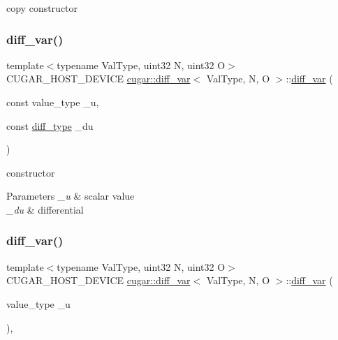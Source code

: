 copy constructor \mbox{\label{structcugar_1_1diff__var_a3fa7d4d596c209e89ae543fe023666ca}} 
\subsubsection{\texorpdfstring{diff\+\_\+var()}{diff\_var()}\hspace{0.1cm}{\footnotesize\ttfamily [3/4]}}
{\footnotesize\ttfamily template$<$typename Val\+Type, uint32 N, uint32 O$>$ \\
C\+U\+G\+A\+R\+\_\+\+H\+O\+S\+T\+\_\+\+D\+E\+V\+I\+CE \hyperlink{structcugar_1_1diff__var}{cugar\+::diff\+\_\+var}$<$ Val\+Type, N, O $>$\+::\hyperlink{structcugar_1_1diff__var}{diff\+\_\+var} (\begin{DoxyParamCaption}\item[{const value\+\_\+type}]{\+\_\+u,  }\item[{const \hyperlink{structcugar_1_1_vector}{diff\+\_\+type}}]{\+\_\+du }\end{DoxyParamCaption})\hspace{0.3cm}{\ttfamily [inline]}}

constructor


\begin{DoxyParams}{Parameters}
{\em \+\_\+u} & scalar value \\
\hline
{\em \+\_\+du} & differential \\
\hline
\end{DoxyParams}
\mbox{\label{structcugar_1_1diff__var_a3dfedcb37cf1bdbf2f6b2f9bd15bc65f}} 
\subsubsection{\texorpdfstring{diff\+\_\+var()}{diff\_var()}\hspace{0.1cm}{\footnotesize\ttfamily [4/4]}}
{\footnotesize\ttfamily template$<$typename Val\+Type, uint32 N, uint32 O$>$ \\
C\+U\+G\+A\+R\+\_\+\+H\+O\+S\+T\+\_\+\+D\+E\+V\+I\+CE \hyperlink{structcugar_1_1diff__var}{cugar\+::diff\+\_\+var}$<$ Val\+Type, N, O $>$\+::\hyperlink{structcugar_1_1diff__var}{diff\+\_\+var} (\begin{DoxyParamCaption}\item[{value\+\_\+type}]{\+\_\+u }\end{DoxyParamCaption})\hspace{0.3cm}{\ttfamily [inline]}, {\ttfamily [explicit]}}

